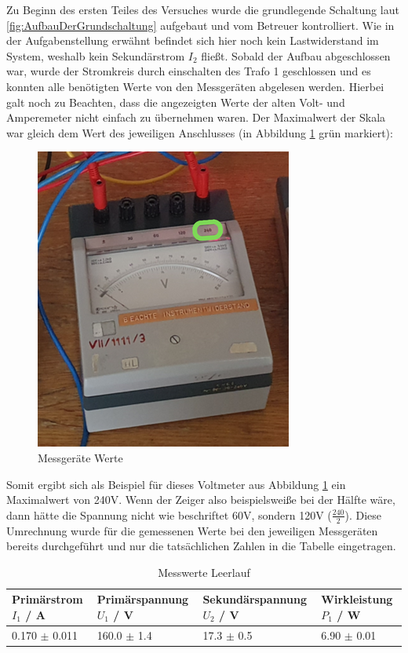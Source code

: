 \documentclass[12pt,a4paper,twoside]{article}
\begin{document}
Zu Beginn des ersten Teiles des Versuches wurde die grundlegende Schaltung laut \ref{fig:AufbauDerGrundschaltung} aufgebaut und vom Betreuer kontrolliert.
Wie in der Aufgabenstellung erwähnt befindet sich hier noch kein Lastwiderstand im System, weshalb kein Sekundärstrom $I_{2}$ fließt. Sobald der Aufbau abgeschlossen war, wurde der Stromkreis durch einschalten des Trafo 1 geschlossen und es konnten alle benötigten Werte von den Messgeräten abgelesen werden.
Hierbei galt noch zu Beachten, dass die angezeigten Werte der alten Volt- und Amperemeter nicht einfach zu übernehmen waren. Der Maximalwert der Skala war gleich dem Wert des jeweiligen Anschlusses (in Abbildung \ref{fig:MessgerätWerte} grün markiert):

\begin{figure}[H]
    \centering
    \includegraphics[width=0.4\linewidth, angle=0]{nudes/VoltmeterBeschriftung.png}
    \caption{Messgeräte Werte}
    \label{fig:MessgerätWerte}
\end{figure}

\noindent
Somit ergibt sich als Beispiel für dieses Voltmeter aus Abbildung \ref{fig:MessgerätWerte} ein Maximalwert von 240V. Wenn der Zeiger also beispielsweiße bei der Hälfte wäre, dann hätte die Spannung nicht wie beschriftet 60V, sondern 120V ($\frac{240}{2}$). Diese Umrechnung wurde für die gemessenen Werte bei den jeweiligen Messgeräten bereits durchgeführt und nur die tatsächlichen Zahlen in die Tabelle eingetragen.

\begin{table}[H]
    \centering
    \caption{Messwerte Leerlauf}
    \label{tab:messwerteLeerlauf}
    \begin{tabular}{| l | l | l | l |}
        \hline
        Primärstrom $I_{1}$ / A  & Primärspannung $U_{1}$ / V & Sekundärspannung $U_{2}$ / V & Wirkleistung $P_{1}$ / W \\
        \hline
        0.170 $\pm$ 0.011 & 160.0 $\pm$ 1.4 & 17.3 $\pm$ 0.5 & 6.90 $\pm$ 0.01 \\
        \hline
    \end{tabular}
\end{table}
\end{document}
